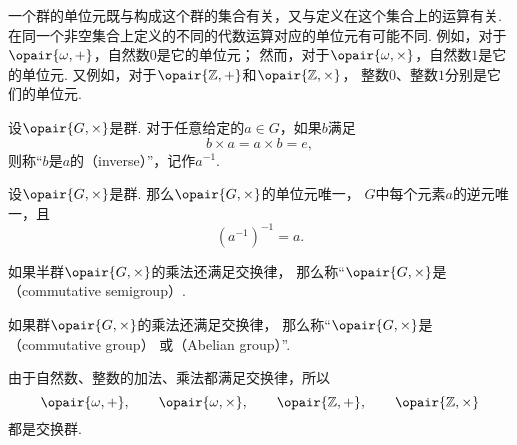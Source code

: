 一个群的单位元既与构成这个群的集合有关，又与定义在这个集合上的运算有关.
在同一个非空集合上定义的不同的代数运算对应的单位元有可能不同.
例如，对于\(\opair{\omega,+}\)，自然数\(0\)是它的单位元；
然而，对于\(\opair{\omega,\times}\)，自然数\(1\)是它的单位元.
又例如，对于\(\opair{\mathbb{Z},+}\)和\(\opair{\mathbb{Z},\times}\)，
整数\(0\)、整数\(1\)分别是它们的单位元.

\begin{definition}
设\(\opair{G,\times}\)是群.
对于任意给定的\(a \in G\)，如果\(b\)满足\[
    b \times a = a \times b = e,
\]
则称“\(b\)是\(a\)的（inverse）”，记作\(a^{-1}\).
\end{definition}

\begin{property}
设\(\opair{G,\times}\)是群.
那么\(\opair{G,\times}\)的单位元唯一，
\(G\)中每个元素\(a\)的逆元唯一，且\[
    (a^{-1})^{-1} = a.
\]
\end{property}

\begin{definition}
如果半群\(\opair{G,\times}\)的乘法还满足交换律，
那么称“\(\opair{G,\times}\)是（commutative semigroup）.
\end{definition}

\begin{definition}
如果群\(\opair{G,\times}\)的乘法还满足交换律，
那么称“\(\opair{G,\times}\)是（commutative group）%
或（Abelian group）”.
\end{definition}

由于自然数、整数的加法、乘法都满足交换律，所以\[
	\opair{\omega,+}, \qquad
	\opair{\omega,\times}, \qquad
	\opair{\mathbb{Z},+}, \qquad
	\opair{\mathbb{Z},\times}
\]都是交换群.
